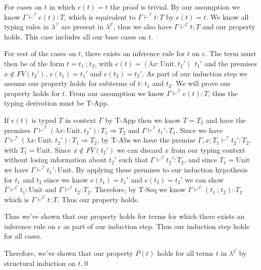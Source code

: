 \documentclass[12pt, fleqn]{article}
\begin{document}
\begin{enumerate}[(a)]
    For cases on $t$ in which $e(t) = t$ the proof is trivial.
    By our assumption we know $\Gamma \vdash^{\mathcal{I}} e(t) : T$, which is equivalent to $\Gamma \vdash^{\mathcal{I}} t : T$
    by $e(t) = t$. We know all typing rules in $\lambda^{\mathcal{I}}$ are present in $\lambda^\mathcal{E}$, thus we also have 
    $\Gamma \vdash^{\mathcal{E}} t : T$ and our property holds. This case includes all our base cases on $t$.

    For rest of the cases on $t$, there exists an inference rule for $t$ on $e$. The term must then be of the form $t = t_1\:\textrm{;}\:t_2$,
    with $e(t) = (\lambda x: \textrm{Unit}.\:t_2')\:\:t_1'$ and the premises $x \notin FV(t_2')$, $e(t_1) = t_1'$ and $e(t_2) = t_2'$.
    As part of our induction step we assume our property holds for subterms of $t$: $t_1$ and $t_2$. We will prove our property holds for $t$. 
    From our assumption we know $\Gamma \vdash^{\mathcal{I}} e(t) : T$, thus the typing derivation must be T-App.

    If $e(t)$ is typed $T$ in context $\Gamma$ by T-App then we know $T = T_2$ and have the premises $\Gamma \vdash^{\mathcal{I}}
    (\lambda x: \textrm{Unit}.\:t_2') : T_1 \Rightarrow T_2$ and $\Gamma \vdash^{\mathcal{I}} t_1' : T_1$. Since we have
    $\Gamma \vdash^{\mathcal{I}} (\lambda x: \textrm{Unit}.\:t_2') : T_1 \Rightarrow T_2$, by T-Abs we have the premise
    $\Gamma, x: T_1 \vdash^{\mathcal{I}} t_2' : T_2$, with $T_1 = \textrm{Unit}$. Since $x \notin FV(t_2')$ we can discard $x$
    from our typing context without losing information about $t_2'$ such that $\Gamma \vdash^{\mathcal{I}} t_2' : T_2$, and since $T_1 = \textrm{Unit}$ we have $\Gamma \vdash^{\mathcal{I}} t_1' : \textrm{Unit}$.
    By applying these premises to our induction hypothesis for $t_1$ and $t_2$ since we know $e(t_1) = t_1'$ and $e(t_2) = t_2'$ we can
    show $\Gamma \vdash^{\mathcal{E}} t_1 : \textrm{Unit}$ and $\Gamma \vdash^{\mathcal{E}} t_2 : T_2$. Therefore, by
    T-Seq we know $\Gamma \vdash^{\mathcal{E}} (t_1\:\textrm{;}\:t_2) : T_2$ which is $\Gamma \vdash^{\mathcal{E}} t : T$.
    Thus our property holds.

    Thus we've shown that our property holds for terms for which there exists an inference rule on $e$ as part of our
    induction step. Thus our induction step holds for all cases.

    Therefore, we've shown that our property $P(t)$ holds for all terms $t$ in $\lambda^{\mathcal{E}}$ by structural 
    induction on $t$.\qed

\end{enumerate}
\end{document}
